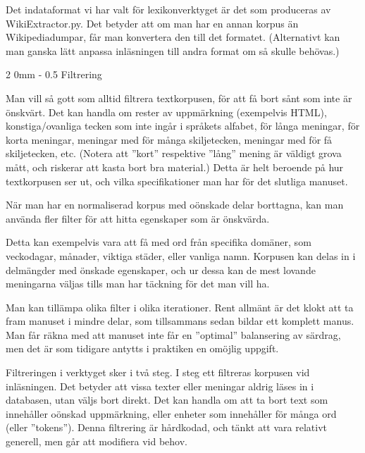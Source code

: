 \documentclass[11pt, a4paper, twoside]{article}
\makeatletter
\renewcommand{\subsubsection}{\@startsection
  {subsubsection}%
  {3}%
  {0mm}%
  {-\baselineskip}%
  {0.5\baselineskip}%
  {\bfseries\sffamily}}%
\renewcommand{\subsection}{\@startsection
  {subsection}%
  {2}%
  {0mm}%
  {-\baselineskip}%
  {0.5\baselineskip}%
  {\bfseries\sffamily\large}}%
\makeatother
\begin{document}
Det indataformat vi har valt för lexikonverktyget är det som produceras av WikiExtractor.py. Det betyder att om man har en annan korpus än Wikipediadumpar, får man konvertera den till det formatet. (Alternativt kan man ganska lätt anpassa inläsningen till andra format om så skulle behövas.)

%



\subsection{Filtrering}

Man vill så gott som alltid filtrera textkorpusen, för att få bort sånt som inte är önskvärt. Det kan handla om rester av uppmärkning (exempelvis HTML), konstiga/ovanliga tecken som inte ingår i språkets alfabet, för långa meningar, för korta meningar, meningar med för många skiljetecken, meningar med för få skiljetecken, etc. (Notera att ''kort''  respektive ''lång'' mening är väldigt grova mått, och riskerar att kasta bort bra material.) Detta är helt beroende på hur textkorpusen ser ut, och vilka specifikationer man har för det slutliga manuset.

När man har en normaliserad korpus med oönskade delar borttagna, kan man använda fler filter för att hitta egenskaper som är önskvärda.

Detta kan exempelvis vara att få med ord från specifika domäner, som veckodagar, månader, viktiga städer, eller vanliga namn. Korpusen kan delas in i delmängder med önskade egenskaper, och ur dessa kan de mest lovande meningarna väljas tills man har täckning för det man vill ha.

Man kan tillämpa olika filter i olika iterationer. Rent allmänt är det klokt att ta fram manuset i mindre delar, som tillsammans sedan bildar ett komplett manus. Man får räkna med att manuset inte får en ''optimal'' balansering av särdrag, men det är som tidigare antytts i praktiken en omöjlig uppgift. 

Filtreringen i verktyget sker i två steg.  I steg ett filtreras korpusen vid inläsningen. Det betyder att vissa texter eller meningar aldrig läses in i databasen, utan väljs bort direkt. Det kan handla om att ta bort text som innehåller oönskad uppmärkning, eller enheter som innehåller för många ord (eller ''tokens''). Denna filtrering är hårdkodad, och tänkt att vara relativt generell, men går att modifiera vid behov.
\end{document}
